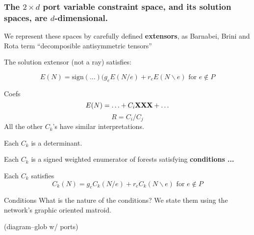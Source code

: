 \documentclass{article}
\begin{document}

\begin{frame}
\frametitle{The $2\times d$ port variable constraint space, 
and its solution spaces, are $d$-dimensional.}

We represent these spaces by carefully defined
\textbf{extensors}, as Barnabei, Brini and Rota \cite{exteriorCalc}
term ``decomposible antisymmetric tensors''

The solution extensor (not a ray) satisfies:

\[
E(N) = \text{sign}(...)(g_e E(N/e) + r_e E(N\backslash e)
\text{\ for\ }e\not\in P
\]

\end{frame}



\begin{frame}{Coefs}
\[
E(N) = \ldots + C_i\mbox{\bf XXX} + \ldots
\]
\[
R = C_i/C_j
\]
All the other $C_k$'s have similar interpretations.

Each $C_k$ is a determinant.

Each $C_k$ is a signed weighted enumerator of
forests satisfying \textbf{conditions ...}

Each $C_k$ satisfies
\[
C_k(N) = g_e C_k(N/e) + r_e C_k(N\backslash e)
\text{\ for\ }e\not\in {P}
\]

\end{frame}

\begin{frame}{Conditions}
What is the nature of the conditions?  We state them using the 
network's graphic oriented matroid.

(diagram--glob w/ ports)

\end{frame}





\end{document}
